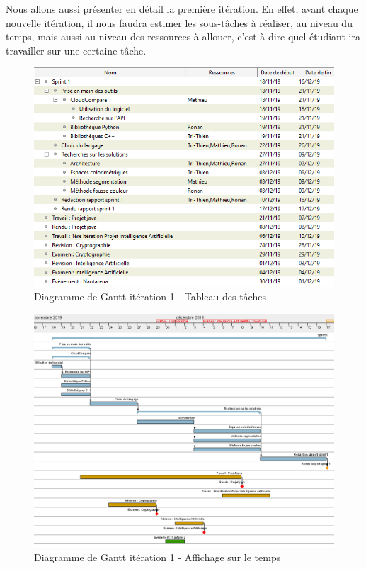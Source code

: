\documentclass[12pt,titlepage,french]{article}
\begin{document}
Nous allons aussi présenter en détail la première itération. En effet, avant chaque nouvelle itération, il nous faudra estimer les sous-tâches à réaliser, au niveau du temps, mais aussi au niveau des ressources à allouer, c'est-à-dire quel étudiant ira travailler sur une certaine tâche.

\begin{figure} [!hbtp]
 \centering
    \caption{Diagramme de Gantt itération 1 - Tableau des tâches}
    \label{Diagramme de Gantt itération 1 - Tableau des tâches}
    \includegraphics[scale=1,origin=c]{img_gantt/tableau_gantt_iteration1.PNG}
\end{figure}
\break
\begin{figure} [!hbtp]
 \centering
    \caption{Diagramme de Gantt itération 1 - Affichage sur le temps}
    \label{Diagramme de Gantt itération 1 - Affichage sur le temps}
    \includegraphics[scale=0.6, origin=c]{img_gantt/affichage_gantt_iteration1.PNG}
\end{figure}
\end{document}
